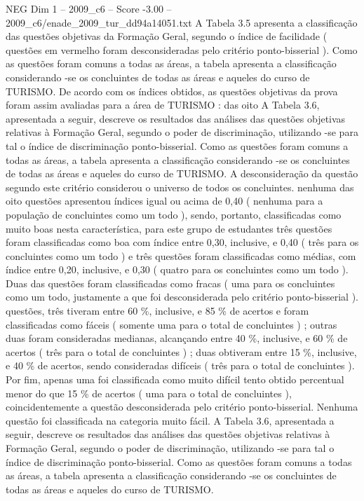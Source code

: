\begin{textsample}{NEG Dim 1 – 2009\_c6 – Score -3.00 – 2009\_c6/enade\_2009\_tur\_dd94a14051.txt}
A Tabela 3.5 apresenta a classificação das questões objetivas da Formação Geral, segundo o índice de facilidade ( questões em vermelho foram desconsideradas pelo critério ponto-bisserial ).
Como as questões foram comuns a todas as áreas, a tabela apresenta a classificação considerando -se os concluintes de todas as áreas e aqueles do curso de TURISMO.
De acordo com os índices obtidos, as questões objetivas da prova foram assim avaliadas para a área de TURISMO : das oito A Tabela 3.6, apresentada a seguir, descreve os resultados das análises das questões objetivas relativas à Formação Geral, segundo o poder de discriminação, utilizando -se para tal o índice de discriminação ponto-bisserial.
Como as questões foram comuns a todas as áreas, a tabela apresenta a classificação considerando -se os concluintes de todas as áreas e aqueles do curso de TURISMO.
A desconsideração da questão segundo este critério considerou o universo de todos os concluintes. nenhuma das oito questões apresentou índices igual ou acima de 0,40 ( nenhuma para a população de concluintes como um todo ), sendo, portanto, classificadas como muito boas nesta característica, para este grupo de estudantes três questões foram classificadas como boa com índice entre 0,30, inclusive, e 0,40 ( três para os concluintes como um todo ) e três questões foram classificadas como médias, com índice entre 0,20, inclusive, e 0,30 ( quatro para os concluintes como um todo ).
Duas das questões foram classificadas como fracas ( uma para os concluintes como um todo, justamente a que foi desconsiderada pelo critério ponto-bisserial ). questões, três tiveram entre 60 \%, inclusive, e 85 \% de acertos e foram classificadas como fáceis ( somente uma para o total de concluintes ) ; outras duas foram consideradas medianas, alcançando entre 40 \%, inclusive, e 60 \% de acertos ( três para o total de concluintes ) ; duas obtiveram entre 15 \%, inclusive, e 40 \% de acertos, sendo consideradas difíceis ( três para o total de concluintes ).
Por fim, apenas uma foi classificada como muito difícil tento obtido percentual menor do que 15 \% de acertos ( uma para o total de concluintes ), coincidentemente a questão desconsiderada pelo critério ponto-bisserial.
Nenhuma questão foi classificada na categoria muito fácil.
A Tabela 3.6, apresentada a seguir, descreve os resultados das análises das questões objetivas relativas à Formação Geral, segundo o poder de discriminação, utilizando -se para tal o índice de discriminação ponto-bisserial.
Como as questões foram comuns a todas as áreas, a tabela apresenta a classificação considerando -se os concluintes de todas as áreas e aqueles do curso de TURISMO.

\end{textsample}
